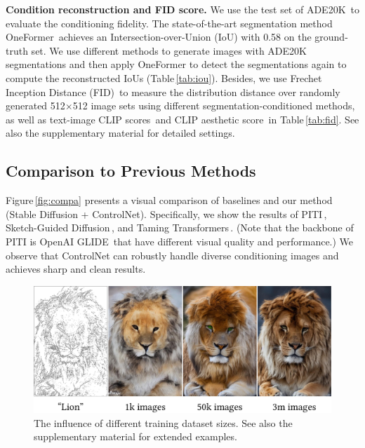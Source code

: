 \documentclass[10pt,twocolumn,letterpaper]{article}
\def\para#1{\vspace{0.25em}\noindent\textbf{#1}}
\begin{document}
	\para{Condition reconstruction and FID score.}
	We use the test set of ADE20K\,\cite{zhou2017scene} to evaluate the conditioning fidelity.
	The state-of-the-art segmentation method OneFormer\,\cite{jain2022oneformer} achieves an Intersection-over-Union (IoU) with 0.58 on the ground-truth set.
	We use different methods to generate images with ADE20K segmentations and then apply OneFormer to detect the segmentations again to compute the reconstructed IoUs (Table\,\ref{tab:iou}).
	Besides, we use Frechet Inception Distance (FID)\,\cite{NIPS2017_8a1d6947} to measure the distribution distance over randomly generated 512$\times$512 image sets using different segmentation-conditioned methods, as well as text-image CLIP scores\,\cite{radford2021learning} and CLIP aesthetic score\,\cite{schuhmann2022laionb} in Table\,\ref{tab:fid}. See also the supplementary material for detailed settings.
	
	\subsection{Comparison to Previous Methods}
	Figure\,\ref{fig:compa} presents a visual comparison of baselines and our method (Stable Diffusion + ControlNet). Specifically, we show the results of PITI\,\cite{wang2022pretraining}, Sketch-Guided Diffusion\,\cite{voynov2022sketch}, and Taming Transformers\,\cite{esser2021taming}. (Note that the backbone of PITI is OpenAI GLIDE\,\cite{glide} that have different visual quality and performance.)
	We observe that ControlNet can robustly handle diverse conditioning images and achieves sharp and clean results.
	
	\begin{figure}[!t]
		\includegraphics[width=\linewidth]{./imgs/datasize.pdf}
		\vspace{-18pt}
		\caption{The influence of different training dataset sizes. See also the supplementary material for extended examples.}
		\vspace{-1pt}
		\label{fig:datasize}
		\vspace{-10pt}
	\end{figure}
	
\end{document}
